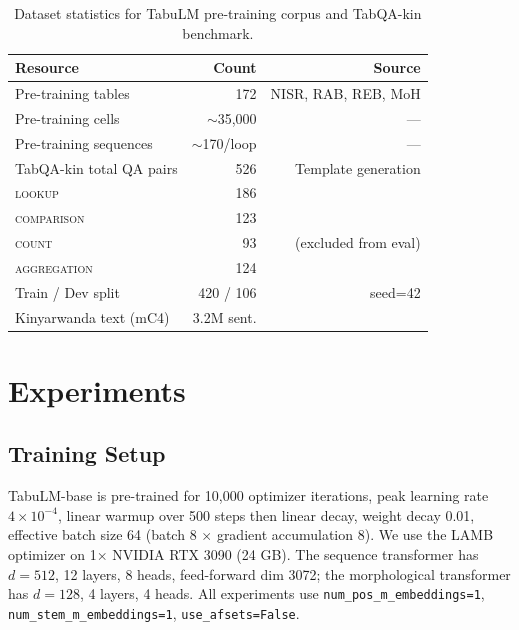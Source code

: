 \documentclass[11pt]{article}
\begin{document}
\begin{table}[t]
\centering
\small
\begin{tabular}{lrr}
\toprule
\textbf{Resource} & \textbf{Count} & \textbf{Source} \\
\midrule
Pre-training tables     & 172  & NISR, RAB, REB, MoH \\
Pre-training cells      & $\sim$35,000  & --- \\
Pre-training sequences  & $\sim$170/loop & --- \\
\midrule
TabQA-kin total QA pairs & 526 & Template generation \\
\quad \textsc{lookup}       & 186 & \\
\quad \textsc{comparison}   & 123 & \\
\quad \textsc{count}        & 93  & (excluded from eval) \\
\quad \textsc{aggregation}  & 124 & \\
Train / Dev split       & 420 / 106 & seed=42 \\
\midrule
Kinyarwanda text (mC4)  & 3.2M sent. & \citet{raffel-etal-2020-exploring} \\
\bottomrule
\end{tabular}
\caption{Dataset statistics for TabuLM pre-training corpus and TabQA-kin benchmark.}
\label{tab:data_stats}
\end{table}

\section{Experiments}
\label{sec:experiments}

\subsection{Training Setup}
\label{sec:setup}

TabuLM-base is pre-trained for 10,000 optimizer iterations, peak learning rate $4 \times 10^{-4}$, linear warmup over 500 steps then linear decay, weight decay 0.01, effective batch size 64 (batch 8 $\times$ gradient accumulation 8).
We use the LAMB optimizer on 1$\times$ NVIDIA RTX 3090 (24 GB).
The sequence transformer has $d=512$, 12 layers, 8 heads, feed-forward dim 3072; the morphological transformer has $d=128$, 4 layers, 4 heads.
All experiments use \texttt{num\_pos\_m\_embeddings=1}, \texttt{num\_stem\_m\_embeddings=1}, \texttt{use\_afsets=False}.
\end{document}
